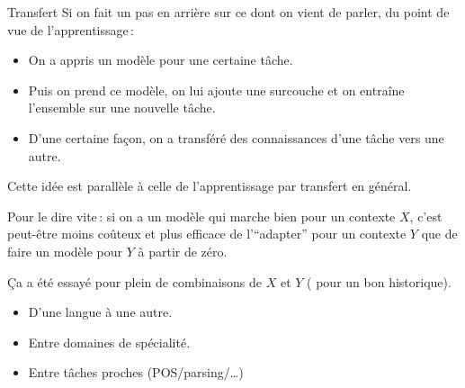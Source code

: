\documentclass[
	xcolor={svgnames},
	aspectratio=169,
	french,
]{beamer}
\begin{document}
\begin{frame}{Transfert}
	Si on fait un pas en arrière sur ce dont on vient de parler, du point de vue de
	l'apprentissage :

	\pause

	\begin{itemize}[<+->]
		\item On a appris un modèle pour une certaine tâche.
		\item Puis on prend ce modèle, on lui ajoute une surcouche et on entraîne l'ensemble sur une
		      nouvelle tâche.
		\item D'une certaine façon, on a \alert{transféré} des connaissances d'une tâche vers une
		      autre.
	\end{itemize}
\end{frame}

\begin{frame}{}
	Cette idée est parallèle à celle de l'\alert{apprentissage par transfert} en général.

	\pause

	Pour le dire vite : si on a un modèle qui marche bien pour un contexte \(X\), c'est peut-être
	moins coûteux et plus efficace de l'\enquote{\alert{adapter}} pour un contexte \(Y\) que de
	faire un modèle pour \(Y\) à partir de zéro.

	\pause

	Ça a été essayé pour plein de combinaisons de \(X\) et \(Y\)
	(\textcite{ruder2019NeuralTransferLearning} pour un bon historique).

	\begin{itemize}
		\item D'une langue à une autre.
		\item Entre domaines de spécialité.
		\item Entre tâches proches (POS/parsing/…)
	\end{itemize}
\end{frame}
\end{document}
